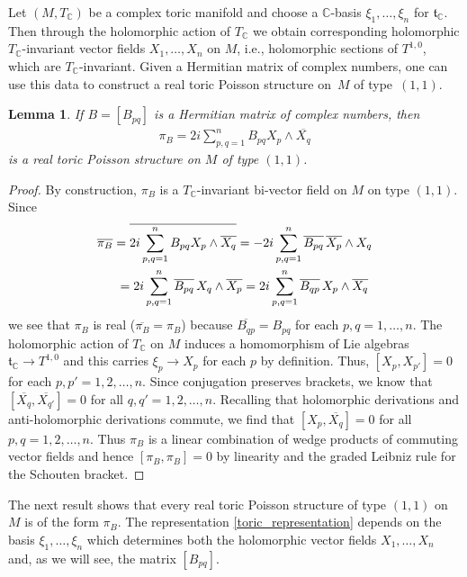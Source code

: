 \documentclass[pdftex]{sigma}
\numberwithin{equation}{section}
\newtheorem{Lemma}[Theorem]{Lemma}
\begin{document}
Let $(M,T_{\mathbb C})$ be a complex toric manifold and choose a ${\mathbb C}$-basis $\xi_1,\dots,\xi_n$ for ${\mathfrak t}_{\mathbb C}$. Then through the holomorphic action of $T_{\mathbb C}$ we obtain corresponding holomorphic $T_{\mathbb C}$-invariant vector f\/ields $X_1,\dots,X_n$ on $M$, i.e., holomorphic sections of $T^{1,0}$, which are $T_{\mathbb C}$-invariant. Given a Hermitian matrix of complex numbers, one can use this data to construct a real toric Poisson structure on~$M$ of type~$(1,1)$.

\begin{Lemma} \label{model_for_toric_PS_lemma}
If $B=[B_{pq}]$ is a Hermitian matrix of complex numbers, then
\begin{gather}\label{toric_representation}
\pi_B=2i\sum_{p,q=1}^n B_{pq}X_p\wedge \overline{X_q}
\end{gather}
is a real toric Poisson structure on $M$ of type $(1,1)$.
\end{Lemma}
\begin{proof}
By construction, $\pi_B$ is a $T_{\mathbb C}$-invariant bi-vector f\/ield on $M$ on type $(1,1)$. Since
\begin{gather*}
\overline{\pi_B} =  \overline{2i\sum_{p,q=1}^n B_{pq}X_p\wedge \overline{X_q}} = -2i\sum_{p,q=1}^n \overline{B_{pq}}\,\overline{X_p}\wedge X_q \\
\hphantom{\overline{\pi_B}}{} = 2i\sum_{p,q=1}^n \overline{B_{pq}}\, X_q\wedge \overline{X_p} = 2i\sum_{p,q=1}^n \overline{B_{qp}}\,X_p\wedge \overline{X_q} \end{gather*}
we see that $\pi_B$ is real ($\overline{\pi_B}=\pi_B$) because $\overline{B_{qp}}=B_{pq}$ for each $p,q=1,\dots,n$. The holomorphic action of $T_{\mathbb C}$ on $M$ induces a homomorphism of Lie algebras ${\mathfrak t}_{\mathbb C}\to T^{1,0}$ and this carries $\xi_p\to X_p$ for each $p$ by def\/inition. Thus, $[X_p,X_{p'}]=0$ for each $p,p'=1,2,\dots,n$. Since conjugation preserves brackets, we know that $[\overline{X_q},\overline{X_{q'}}]=0$ for all $q,q'=1,2,\dots,n$. Recalling that holomorphic derivations and anti-holomorphic derivations commute, we f\/ind that $[X_p,\overline{X_q}]=0$ for all $p,q=1,2,\dots,n$. Thus $\pi_B$ is a linear combination of wedge products of commuting vector f\/ields and hence $[\pi_B,\pi_B]=0$ by linearity and the graded Leibniz rule for the Schouten bracket.
\end{proof}

The next result shows that every real toric Poisson structure of type $(1,1)$ on $M$ is of the form $\pi_B$. The representation \eqref{toric_representation} depends on the basis $\xi_1,\dots,\xi_n$ which determines both the holomorphic vector f\/ields $X_1,\dots,X_n$ and, as we will see, the matrix $[B_{pq}]$.
\end{document}
